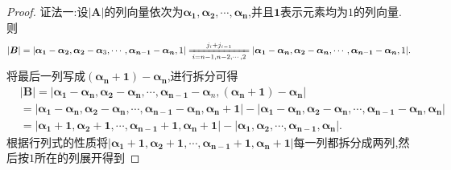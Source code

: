 \documentclass[../../main.tex]{subfiles}%
\begin{document}
\begin{proof}

{\color{blue}证法一:}设\(|\boldsymbol{A}|\)的列向量依次为\(\boldsymbol{\alpha }_{\mathbf{1}},\boldsymbol{\alpha }_{\mathbf{2}},\cdots ,\boldsymbol{\alpha }_{\boldsymbol{n}}\),并且\(\mathbf{1}\)表示元素均为\(1\)的列向量.则
\begin{align*}
|\boldsymbol{B}|=|\boldsymbol{\alpha }_{\mathbf{1}}-\boldsymbol{\alpha }_{\mathbf{2}},\boldsymbol{\alpha }_{\mathbf{2}}-\boldsymbol{\alpha }_{3},\cdots ,\boldsymbol{\alpha }_{\boldsymbol{n}-\mathbf{1}}-\boldsymbol{\alpha }_{\boldsymbol{n}},1|\xlongequal[i=n-1,n-2,\cdots ,2]{j_i+j_{i-1}}|\boldsymbol{\alpha }_{\mathbf{1}}-\boldsymbol{\alpha }_{\boldsymbol{n}},\boldsymbol{\alpha }_{\mathbf{2}}-\boldsymbol{\alpha }_{\boldsymbol{n}},\cdots ,\boldsymbol{\alpha }_{\boldsymbol{n}-\mathbf{1}}-\boldsymbol{\alpha }_{\boldsymbol{n}},1|.        
\end{align*}
将最后一列写成\((\boldsymbol{\alpha}_{\boldsymbol{n}} + \mathbf{1}) - \boldsymbol{\alpha}_{\boldsymbol{n}}\),进行拆分可得
\begin{align*}
&|\boldsymbol{B}| = |\boldsymbol{\alpha}_{\boldsymbol{1}} - \boldsymbol{\alpha}_{\boldsymbol{n}},\boldsymbol{\alpha}_{\boldsymbol{2}} - \boldsymbol{\alpha}_{\boldsymbol{n}},\cdots,\boldsymbol{\alpha}_{\boldsymbol{n - 1}} - \boldsymbol{\alpha}_n,(\boldsymbol{\alpha}_{\boldsymbol{n}} + \mathbf{1}) - \boldsymbol{\alpha}_{\boldsymbol{n}}|
\\
&= |\boldsymbol{\alpha}_{\boldsymbol{1}} - \boldsymbol{\alpha}_{\boldsymbol{n}},\boldsymbol{\alpha}_{\boldsymbol{2}} - \boldsymbol{\alpha}_{\boldsymbol{n}},\cdots,\boldsymbol{\alpha}_{\boldsymbol{n - 1}} - \boldsymbol{\alpha}_{\boldsymbol{n}},\boldsymbol{\alpha}_{\boldsymbol{n}} + \mathbf{1}| - |\boldsymbol{\alpha}_{\boldsymbol{1}} - \boldsymbol{\alpha}_{\boldsymbol{n}},\boldsymbol{\alpha}_{\boldsymbol{2}} - \boldsymbol{\alpha}_{\boldsymbol{n}},\cdots,\boldsymbol{\alpha}_{\boldsymbol{n - 1}} - \boldsymbol{\alpha}_{\boldsymbol{n}},\boldsymbol{\alpha}_{\boldsymbol{n}}|
\\
&= |\boldsymbol{\alpha}_{\boldsymbol{1}} + \mathbf{1},\boldsymbol{\alpha}_{\boldsymbol{2}} + \mathbf{1},\cdots,\boldsymbol{\alpha}_{\boldsymbol{n - 1}} + \mathbf{1},\boldsymbol{\alpha}_{\boldsymbol{n}} + \mathbf{1}| - |\boldsymbol{\alpha}_{\boldsymbol{1}},\boldsymbol{\alpha}_{\boldsymbol{2}},\cdots,\boldsymbol{\alpha}_{\boldsymbol{n-1}},\boldsymbol{\alpha}_{\boldsymbol{n}}|.
\end{align*}
根据行列式的性质将\(|\boldsymbol{\alpha}_{\boldsymbol{1}} + \mathbf{1},\boldsymbol{\alpha}_{\boldsymbol{2}} + \mathbf{1},\cdots,\boldsymbol{\alpha}_{\boldsymbol{n-1}} + \mathbf{1},\boldsymbol{\alpha}_{\boldsymbol{n}} + \mathbf{1}|\)每一列都拆分成两列,然后按\(1\)所在的列展开得到

\end{proof}
\end{document}
